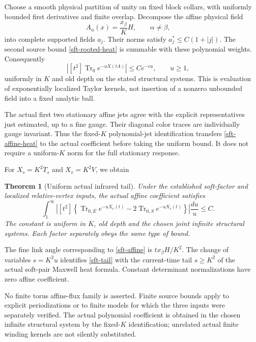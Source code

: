 \documentclass[11pt]{article}
\newtheorem{theorem}{Theorem}[section]
\theoremstyle{remark}
\begin{document}
Choose a smooth physical partition of unity on fixed block collars,
with uniformly bounded first derivatives and finite overlap.
Decompose the affine physical field
\begin{equation}
 A_\alpha(x)=\frac{x_\beta}{K}H,\qquad \alpha\ne\beta,
 \label{sft-affine}
\end{equation}
into complete supported fields \(a_j\).
Their norms satisfy \(a_j^*\le C(1+|j|)\). The second source bound
\eqref{sft-rooted-heat} is summable with these polynomial weights.
Consequently
\begin{equation}
 \left|[t^2]\operatorname{Tr}_0 e^{-uX(tA)}\right|
       \le Ce^{-cu},\qquad u\ge1,
 \label{sft-affine-heat}
\end{equation}
uniformly in \(K\) and old depth on the stated structural systems.
This is evaluation of exponentially localized Taylor kernels,
not insertion of a nonzero unbounded field into a fixed analytic ball.

The actual first two stationary affine jets agree with the explicit
representatives just estimated, up to a fine gauge. Their diagonal
color traces are individually gauge invariant. Thus the fixed-\(K\)
polynomial-jet identification transfers
\eqref{sft-affine-heat} to the actual coefficient before taking the
uniform bound. It does not require a uniform-\(K\) norm for the
full stationary response.

For \(X_s=K^2T_s\) and \(X_v=K^2V\), we obtain
\begin{theorem}[Uniform actual infrared tail]
\label{sft-main}
Under the established soft-factor and localized relative-vertex
inputs, the actual affine coefficient satisfies
\begin{equation}
 \int_1^\infty
  \left|[t^2]\left\{
   \operatorname{Tr}_{0,E}e^{-uX_v(t)}
     -2\operatorname{Tr}_{0,S}e^{-uX_s(t)}
                 \right\}\right|\frac{du}{u}\le C .
 \label{sft-tail}
\end{equation}
The constant is uniform in \(K\), old depth and the chosen joint
infinite structural systems. Each factor separately obeys the same
type of bound.
\end{theorem}

The fine link angle corresponding to \eqref{sft-affine} is
\(t x_\beta H/K^2\). The change of variables \(s=K^2u\)
identifies \eqref{sft-tail} with the current-time tail \(s\ge K^2\)
of the actual soft-pair Maxwell heat formula.
Constant determinant normalizations have zero affine coefficient.

No finite torus affine-flux family is asserted. Finite source bounds
apply to explicit periodizations or to finite models for which the
three inputs were separately verified. The actual polynomial
coefficient is obtained in the chosen infinite structural system by
the fixed-\(K\) identification; unrelated actual finite winding
kernels are not silently substituted.
\end{document}
